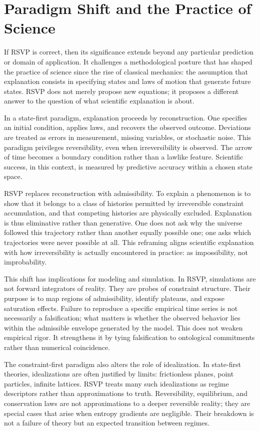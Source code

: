 \documentclass[11pt,oneside]{book}
\begin{document}
\chapter{Paradigm Shift and the Practice of Science}

If RSVP is correct, then its significance extends beyond any particular prediction or domain of application. It challenges a methodological posture that has shaped the practice of science since the rise of classical mechanics: the assumption that explanation consists in specifying states and laws of motion that generate future states. RSVP does not merely propose new equations; it proposes a different answer to the question of what scientific explanation is about.

In a state-first paradigm, explanation proceeds by reconstruction. One specifies an initial condition, applies laws, and recovers the observed outcome. Deviations are treated as errors in measurement, missing variables, or stochastic noise. This paradigm privileges reversibility, even when irreversibility is observed. The arrow of time becomes a boundary condition rather than a lawlike feature. Scientific success, in this context, is measured by predictive accuracy within a chosen state space.

RSVP replaces reconstruction with admissibility. To explain a phenomenon is to show that it belongs to a class of histories permitted by irreversible constraint accumulation, and that competing histories are physically excluded. Explanation is thus eliminative rather than generative. One does not ask why the universe followed this trajectory rather than another equally possible one; one asks which trajectories were never possible at all. This reframing aligns scientific explanation with how irreversibility is actually encountered in practice: as impossibility, not improbability.

This shift has implications for modeling and simulation. In RSVP, simulations are not forward integrators of reality. They are probes of constraint structure. Their purpose is to map regions of admissibility, identify plateaus, and expose saturation effects. Failure to reproduce a specific empirical time series is not necessarily a falsification; what matters is whether the observed behavior lies within the admissible envelope generated by the model. This does not weaken empirical rigor. It strengthens it by tying falsification to ontological commitments rather than numerical coincidence.

The constraint-first paradigm also alters the role of idealization. In state-first theories, idealizations are often justified by limits: frictionless planes, point particles, infinite lattices. RSVP treats many such idealizations as regime descriptors rather than approximations to truth. Reversibility, equilibrium, and conservation laws are not approximations to a deeper reversible reality; they are special cases that arise when entropy gradients are negligible. Their breakdown is not a failure of theory but an expected transition between regimes.
\end{document}
